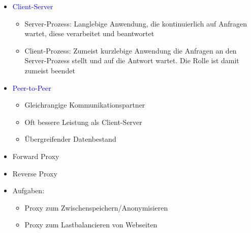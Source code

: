 
\begin{itemize}
    \item \textcolor{blue}{Client-Server}
    \begin{itemize}
        \item Server-Prozess: Langlebige Anwendung, die kontinuierlich auf Anfragen wartet, diese verarbeitet und beantwortet
        \item Client-Prozess: Zumeist kurzlebige Anwendung die Anfragen an den Server-Prozess stellt und auf die Antwort wartet.
        Die Rolle ist damit zumeist beendet
    \end{itemize}
    \item \textcolor{blue}{Peer-to-Peer}
    \begin{itemize}
        \item Gleichrangige Kommunikationspartner
        \item Oft bessere Leistung als Client-Server
        \item Übergreifender Datenbestand
    \end{itemize}
\end{itemize}

\begin{itemize}
    \item Forward Proxy
    \item Reverse Proxy
    \item Aufgaben:
    \begin{itemize}
        \item Proxy zum Zwischenspeichern/Anonymisieren
        \item Proxy zum Lastbalancieren von Webseiten
    \end{itemize}
\end{itemize}

